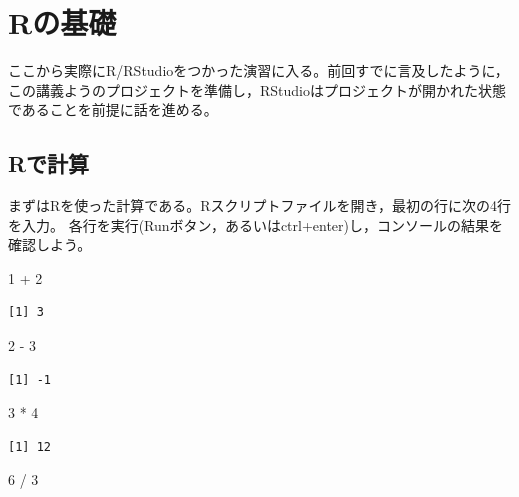 \documentclass[
  a4paper,
]{ltjsbook}
\newenvironment{Shaded}{\begin{snugshade}}{\end{snugshade}}
\newcommand{\DecValTok}[1]{\textcolor[rgb]{0.68,0.00,0.00}{#1}}
\newcommand{\SpecialCharTok}[1]{\textcolor[rgb]{0.37,0.37,0.37}{#1}}
\begin{document}

\hypertarget{rux306eux57faux790e}{%
\chapter{Rの基礎}\label{rux306eux57faux790e}}

ここから実際にR/RStudioをつかった演習に入る。前回すでに言及したように，この講義ようのプロジェクトを準備し，RStudioはプロジェクトが開かれた状態であることを前提に話を進める。

\hypertarget{rux3067ux8a08ux7b97}{%
\section{Rで計算}\label{rux3067ux8a08ux7b97}}

まずはRを使った計算である。Rスクリプトファイルを開き，最初の行に次の4行を入力。
各行を実行(Runボタン，あるいはctrl+enter)し，コンソールの結果を確認しよう。

\begin{Shaded}
\begin{Highlighting}[]
\DecValTok{1} \SpecialCharTok{+} \DecValTok{2}
\end{Highlighting}
\end{Shaded}

\begin{verbatim}
[1] 3
\end{verbatim}

\begin{Shaded}
\begin{Highlighting}[]
\DecValTok{2} \SpecialCharTok{{-}} \DecValTok{3}
\end{Highlighting}
\end{Shaded}

\begin{verbatim}
[1] -1
\end{verbatim}

\begin{Shaded}
\begin{Highlighting}[]
\DecValTok{3} \SpecialCharTok{*} \DecValTok{4}
\end{Highlighting}
\end{Shaded}

\begin{verbatim}
[1] 12
\end{verbatim}

\begin{Shaded}
\begin{Highlighting}[]
\DecValTok{6} \SpecialCharTok{/} \DecValTok{3}
\end{Highlighting}
\end{Shaded}
\end{document}
